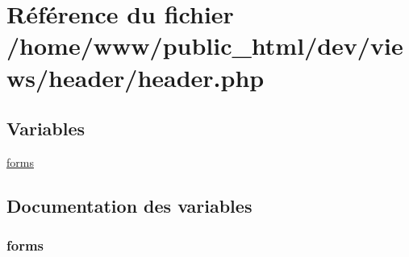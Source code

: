 \hypertarget{header_8php}{\section{Référence du fichier /home/www/public\-\_\-html/dev/views/header/header.php}
\label{header_8php}
}
\subsection*{Variables}
\begin{DoxyCompactItemize}
\item 
\hyperlink{header_8php_a73be892f55064e39b9e32c40304b526e}{forms}
\end{DoxyCompactItemize}


\subsection{Documentation des variables}
\hypertarget{header_8php_a73be892f55064e39b9e32c40304b526e}{
\subsubsection[{forms}]{\setlength{\rightskip}{0pt plus 5cm}forms}}\label{header_8php_a73be892f55064e39b9e32c40304b526e}
